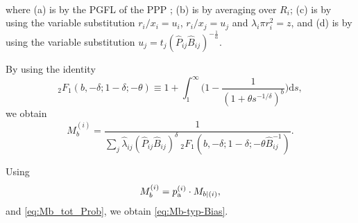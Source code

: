 \documentclass[12pt,draftclsnofoot,journal,onecolumn]{IEEEtran}
\def\dd{\mathrm{d}}
\begin{document}
\begin{IEEEproof}
\begin{align}
	\end{align}
	where (a) is by the PGFL of the PPP \cite[Chap.~4]{Haenggi12book}; (b) is by averaging over $R_i$; (c) is by using the variable substitution $r_i/x_i=u_i$, $r_i/x_j=u_j$ and $\lambda_i \pi r_i^2=z$, and (d) is by using the variable substitution $u_j=t_j(\hat P_{ij} \hat B_{ij})^{-\frac{1}{\alpha}}$.
	
	By using the identity
	\begin{equation}\label{eq:2F1_eqa}
	_2F_1(b,-\delta; 1-\delta; -\theta) \equiv 1+\int_1^\infty \big(1-\frac{1}{(1+\theta s^{-1/\delta})^b}\big)\dd s,
	\end{equation}
	we obtain
	\begin{equation}\label{eq:Mb-ith}
	M_b^{(i)} = \frac{1}{\sum\limits_{j}\hat\lambda_{ij} (\hat P_{ij} \hat B_{ij})^\delta~ _2F_1(b,-\delta; 1-\delta; -\theta\hat B_{ij}^{-1})}.
	\end{equation}
	
	Using 	
	\begin{equation}\label{eq:Mb-ith2}
	M_b^{(i)} = p_{\rm a}^{(i)}\cdot M_{b \mid (i)},
	\end{equation}
	and \eqref{eq:Mb_tot_Prob}, we obtain \eqref{eq:Mb-typ-Bias}.	
\end{IEEEproof}
\end{document}
